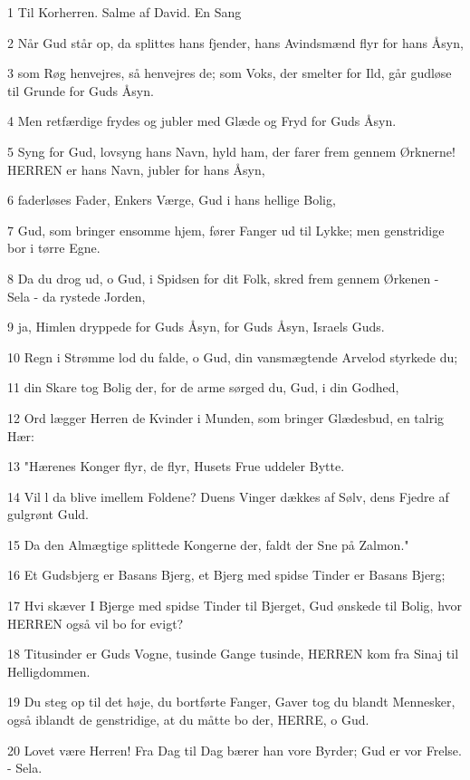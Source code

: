\par 1 Til Korherren. Salme af David. En Sang
\par 2 Når Gud står op, da splittes hans fjender, hans Avindsmænd flyr for hans Åsyn,
\par 3 som Røg henvejres, så henvejres de; som Voks, der smelter for Ild, går gudløse til Grunde for Guds Åsyn.
\par 4 Men retfærdige frydes og jubler med Glæde og Fryd for Guds Åsyn.
\par 5 Syng for Gud, lovsyng hans Navn, hyld ham, der farer frem gennem Ørknerne! HERREN er hans Navn, jubler for hans Åsyn,
\par 6 faderløses Fader, Enkers Værge, Gud i hans hellige Bolig,
\par 7 Gud, som bringer ensomme hjem, fører Fanger ud til Lykke; men genstridige bor i tørre Egne.
\par 8 Da du drog ud, o Gud, i Spidsen for dit Folk, skred frem gennem Ørkenen - Sela - da rystede Jorden,
\par 9 ja, Himlen dryppede for Guds Åsyn, for Guds Åsyn, Israels Guds.
\par 10 Regn i Strømme lod du falde, o Gud, din vansmægtende Arvelod styrkede du;
\par 11 din Skare tog Bolig der, for de arme sørged du, Gud, i din Godhed,
\par 12 Ord lægger Herren de Kvinder i Munden, som bringer Glædesbud, en talrig Hær:
\par 13 "Hærenes Konger flyr, de flyr, Husets Frue uddeler Bytte.
\par 14 Vil l da blive imellem Foldene? Duens Vinger dækkes af Sølv, dens Fjedre af gulgrønt Guld.
\par 15 Da den Almægtige splittede Kongerne der, faldt der Sne på Zalmon."
\par 16 Et Gudsbjerg er Basans Bjerg, et Bjerg med spidse Tinder er Basans Bjerg;
\par 17 Hvi skæver I Bjerge med spidse Tinder til Bjerget, Gud ønskede til Bolig, hvor HERREN også vil bo for evigt?
\par 18 Titusinder er Guds Vogne, tusinde Gange tusinde, HERREN kom fra Sinaj til Helligdommen.
\par 19 Du steg op til det høje, du bortførte Fanger, Gaver tog du blandt Mennesker, også iblandt de genstridige, at du måtte bo der, HERRE, o Gud.
\par 20 Lovet være Herren! Fra Dag til Dag bærer han vore Byrder; Gud er vor Frelse. - Sela.
